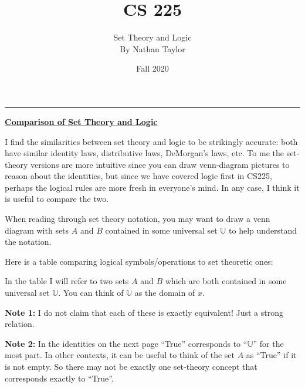 \documentclass[11pt]{article}
\title{CS 225}
\author{{\Large Set Theory and Logic} \\ {\small By Nathan Taylor}}
\date{Fall 2020}
\begin{document}
\maketitle
\hrule

\begin{center}\underline{\bf \huge Comparison of Set Theory and Logic}\end{center}
\bigskip

I find the similarities between set theory and logic to be strikingly accurate:
both have similar identity laws, distributive laws, DeMorgan's laws, etc. 
To me the set-theory versions are more intuitive since you can draw venn-diagram
pictures to reason about the identities, but since we have covered logic first in 
CS225, perhaps the logical rules are more fresh in everyone's mind. In any case, 
I think it is useful to compare the two. 

\bigskip 
When reading through set theory notation, you may want to draw a venn diagram with 
sets $A$ and $B$ contained in some universal set $\mathbb{U}$ to help understand the 
notation. 

\bigskip
Here is a table comparing logical symbols/operations to set theoretic ones:

In the table I will refer to two sets $A$ and $B$ which are both contained 
in some universal set $\mathbb{U}$. You can think of $\mathbb{U}$ as the 
domain of $x$. 

{\bf Note 1:} I do not claim that each of these is exactly equivalent! Just a strong 
relation. 

{\bf Note 2:} In the identities on the next page ``True'' corresponds to ``$\mathbb{U}$''
for the most part. In other contexts, it can be useful to think of the set $A$ as 
``True'' if it is not empty. So there may not be exactly one set-theory concept that 
corresponds exactly to ``True''. 
\end{document}
